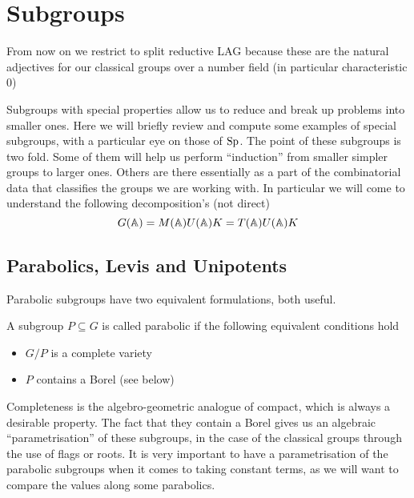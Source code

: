 \section{Subgroups}
From now on we restrict to split reductive LAG because these are the natural adjectives for our classical groups over a number field (in particular characteristic 0)

Subgroups with special properties allow us to reduce and break up problems into smaller ones. Here we will briefly review and compute some examples of special subgroups, with a particular eye on those of \(\operatorname{Sp}\). The point of these subgroups is two fold. Some of them will help us perform ``induction'' from smaller simpler groups to larger ones. Others are there essentially as a part of the combinatorial data that classifies the groups we are working with. In particular we will come to understand the following decomposition's (not direct)
\[G(\A) = M(\A)U(\A) K = T(\A)U(\A)K\]

\subsection{Parabolics, Levis and Unipotents}
Parabolic subgroups have two equivalent formulations, both useful.
\begin{definition}
    A subgroup \(P\subseteq G\) is called parabolic if the following equivalent conditions hold
    \begin{itemize}
        \item \(G/P\) is a complete variety
        \item \(P\) contains a Borel (see below)
    \end{itemize}
\end{definition}

Completeness is the algebro-geometric analogue of compact, which is always a desirable property. The fact that they contain a Borel gives us an algebraic ``parametrisation'' of these subgroups, in the case of the classical groups through the use of flags or roots. It is very important to have a parametrisation of the parabolic subgroups when it comes to taking constant terms, as we will want to compare the values along some parabolics.

